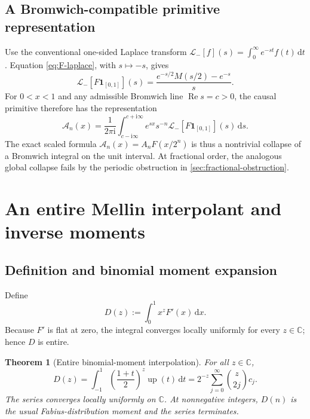 \documentclass[11pt]{article}
\newtheorem{theorem}{Theorem}[section]
\theoremstyle{definition}
\theoremstyle{remark}
\DeclareMathOperator{\upf}{up}
\DeclareMathOperator{\RePart}{Re}
\newcommand{\C}{\mathbb C}
\newcommand{\dd}{\,\mathrm d}
\newcommand{\ii}{\mathrm i}
\newcommand{\Lap}{\mathcal L}
\begin{document}
\subsection{A Bromwich-compatible primitive representation}

Use the conventional one-sided Laplace transform
\(
 \Lap_-[f](s)=\int_0^\infty e^{-st}f(t)\dd t
\).
Equation \eqref{eq:F-laplace}, with \(s\mapsto-s\), gives
\begin{equation}
 \Lap_-[F\mathbf{1}_{[0,1]}](s)
 =\frac{e^{-s/2}M(s/2)-e^{-s}}{s}.                         \label{eq:F-conventional-Laplace}
\end{equation}
For \(0<x<1\) and any admissible Bromwich line \(\RePart s=c>0\), the causal primitive
therefore has the representation
\begin{equation}
 \mathcal A_n(x)
 =\frac1{2\pi\ii}\int_{c-\ii\infty}^{c+\ii\infty}
   e^{sx}s^{-n}\Lap_-[F\mathbf{1}_{[0,1]}](s)\dd s.         \label{eq:Bromwich-primitive}
\end{equation}
The exact scaled formula \(\mathcal A_n(x)=A_nF(x/2^n)\) is thus a nontrivial collapse
of a Bromwich integral on the unit interval.  At fractional order, the analogous
global collapse fails by the periodic obstruction in \cref{sec:fractional-obstruction}.

\section{An entire Mellin interpolant and inverse moments}

\subsection{Definition and binomial moment expansion}

Define
\begin{equation}
 D(z):=\int_0^1x^zF'(x)\dd x.                             \label{eq:D-def}
\end{equation}
Because \(F'\) is flat at zero, the integral converges locally uniformly for every
\(z\in\C\); hence \(D\) is entire.

\begin{theorem}[Entire binomial-moment interpolation]
\label{thm:D-series}
For all \(z\in\C\),
\begin{equation}
 \boxed{
 D(z)=\int_{-1}^1\left(\frac{1+t}{2}\right)^z\upf(t)\dd t
 =2^{-z}\sum_{j=0}^{\infty}\binom z{2j}c_j.
 }                                                        \label{eq:D-series}
\end{equation}
The series converges locally uniformly on \(\C\).  At nonnegative integers, \(D(n)\)
is the usual Fabius-distribution moment and the series terminates.
\end{theorem}
\end{document}
